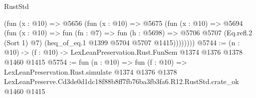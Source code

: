 \begin{lexlean}{RustStd}
\begin{coremodule}
          (fun (x : @10) =>
          @5656
            (fun (x : @10) =>
            @5675
              (fun (x : @10) =>
              @5694
                (fun (x : @10) =>
                fun (fn : @7) =>
                fun (h : @5698) =>
                @5706 @5707 (Eq.refl.{2} (Sort 1) @7) (heq_of_eq.{1} @1399 @5704 @5707 @1415))))))))
@5744 := (n : @10) -> (f : @10) -> LexLeanPreservation.Rust.FunSem @1374 @1376 @1378 @1460 @1415
@5754 := fun (n : @10) =>
  fun (f : @10) =>
  LexLeanPreservation.Rust.simulate
    @1374
    @1376
    @1378
    LexLeanPreserve.Cd3de0d1dc18f88b8ff7fb76ba3fb3fa6.R12.RustStd.crate_ok
    @1460
    @1415
\end{coremodule}
\end{lexlean}
